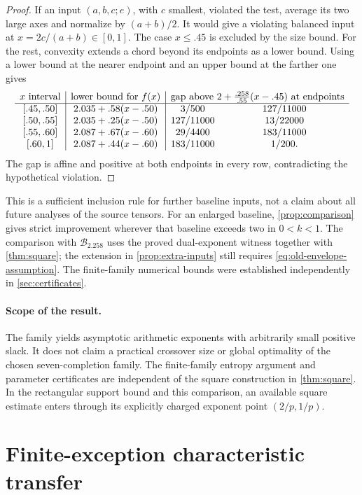 \begin{proof}
If an input \((a,b,c;e)\), with \(c\) smallest, violated the test,
average its two large axes and normalize by \((a+b)/2\).
It would give a violating balanced input at
\(x=2c/(a+b)\in[0,1]\).
The case \(x\le.45\) is excluded by the size bound.
For the rest, convexity extends a chord beyond its endpoints as
a lower bound.
Using a lower bound at the nearer endpoint and an upper bound at
the farther one gives
\[
\begin{array}{c|c|cc}
x\text{ interval}&\text{lower bound for }f(x)&
 \multicolumn{2}{c}{\text{gap above }2+\frac{.258}{.55}(x-.45)
                   \text{ at endpoints}}\\ \hline
{[.45,.50]}&2.035+.58(x-.50)&3/500&127/11000\\
{[.50,.55]}&2.035+.25(x-.50)&127/11000&13/22000\\
{[.55,.60]}&2.087+.67(x-.60)&29/4400&183/11000\\
{[.60,1]}&2.087+.44(x-.60)&183/11000&1/200 .
\end{array}
\]
The gap is affine and positive at both endpoints in every row,
contradicting the hypothetical violation.
\end{proof}

This is a sufficient inclusion rule for further baseline inputs, not
a claim about all future analyses of the source tensors.
For an enlarged baseline, \cref{prop:comparison} gives strict
improvement wherever that baseline exceeds two in \(0<k<1\).
The comparison with \(\mathcal B_{2.258}\) uses the proved
dual-exponent witness together with \cref{thm:square};
the extension in \cref{prop:extra-inputs} still requires
\eqref{eq:old-envelope-assumption}.
The finite-family numerical bounds were established independently
in \cref{sec:certificates}.

\paragraph{Scope of the result.}
The family yields asymptotic arithmetic exponents with arbitrarily
small positive slack.  It does not claim a practical crossover size
or global optimality of the chosen seven-completion family.
The finite-family entropy argument and parameter certificates are
independent of the square construction in \cref{thm:square}.
In the rectangular support bound and this comparison, an available
square estimate enters through its explicitly charged exponent point
\((2/p,1/p)\).

\section{Finite-exception characteristic transfer}\label{sec:characteristic-transfer}

